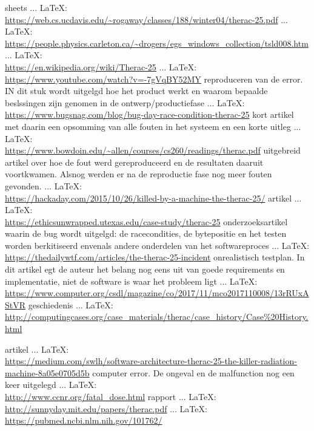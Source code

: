 \begin{thebibliography}{99}
sheets
 ... \LaTeX:\\ \url{https://web.cs.ucdavis.edu/~rogaway/classes/188/winter04/therac-25.pdf}
 ... \LaTeX:\\ \url{https://people.physics.carleton.ca/~drogers/egs_windows_collection/tsld008.htm}
\cite{}
 ... \LaTeX:\\ \url{https://en.wikipedia.org/wiki/Therac-25}
 ... \LaTeX:\\ \url{https://www.youtube.com/watch?v=-7gVqBY52MY}
\cite{}
reproduceren van de error. IN dit stuk wordt uitgelgd hoe het product werkt en waarom bepaalde beslssingen zijn genomen in de ontwerp/productiefase
 ... \LaTeX:\\ \url{https://www.bugsnag.com/blog/bug-day-race-condition-therac-25}
kort artikel met daarin een opsomming van alle fouten in het systeem en een korte uitleg
 ... \LaTeX:\\ \url{https://www.bowdoin.edu/~allen/courses/cs260/readings/therac.pdf}
uitgebreid artikel over hoe de fout werd gereproduceerd en de resultaten daaruit voortkwamen. Alsnog werden er na de reproductie fase nog meer fouten gevonden.
 ... \LaTeX:\\ \url{https://hackaday.com/2015/10/26/killed-by-a-machine-the-therac-25/}
artikel
 ... \LaTeX:\\ \url{https://ethicsunwrapped.utexas.edu/case-study/therac-25}
onderzoeksartikel waarin de bug wordt uitgelgd: de racecondities, de bytepositie en het testen worden berkitiseerd envenals andere onderdelen van het softwareproces
 ... \LaTeX:\\ \url{https://thedailywtf.com/articles/the-therac-25-incident}
\cite{}
onrealistisch testplan. In dit artikel egt de auteur het belang nog eens uit van goede requirements en implementatie, niet de software is waar het probleem ligt
 ... \LaTeX:\\ \url{https://www.computer.org/csdl/magazine/co/2017/11/mco2017110008/13rRUxAStVR}
\cite{}
geschiedenis
 ... \LaTeX:\\ \url{http://computingcases.org/case_materials/therac/case_history/Case%20History.html}

artikel
 ... \LaTeX:\\ \url{https://medium.com/swlh/software-architecture-therac-25-the-killer-radiation-machine-8a05e0705d5b}
computer error. De ongeval en de malfunction nog een keer uitgelegd
 ... \LaTeX:\\ \url{http://www.ccnr.org/fatal_dose.html}
rapport
 ... \LaTeX:\\ \url{http://sunnyday.mit.edu/papers/therac.pdf}
 ... \LaTeX:\\ \url{https://pubmed.ncbi.nlm.nih.gov/101762/}


\end{thebibliography}

